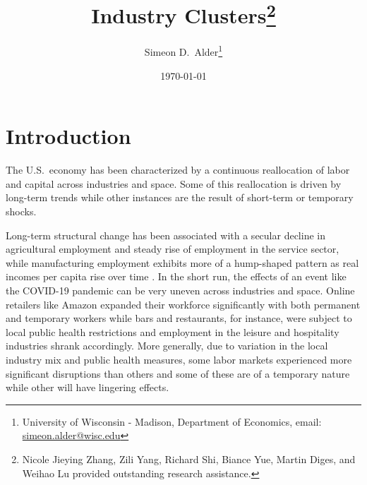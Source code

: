 \documentclass[onehalfspacing,11pt]{article}
\begin{document}
\begin{titlepage}

\title{Industry Clusters\footnote{Nicole Jieying Zhang, Zili Yang, Richard Shi, Biance Yue, Martin Diges, and Weihao Lu provided outstanding research assistance.}}

\author{Simeon D.~Alder\footnote{University of Wisconsin - Madison, Department of Economics, email: \url{simeon.alder@wisc.edu}}}
\date{\today} %

\maketitle
%
%
%
\end{titlepage}


\section{Introduction}
The U.S.~economy has been characterized by a continuous reallocation of labor and capital across industries and space. Some of this reallocation is driven by long-term trends while other instances are the result of short-term or temporary shocks.

Long-term structural change has been associated with a secular decline in agricultural employment and steady rise of employment in the service sector, while manufacturing employment exhibits more of a hump-shaped pattern as real incomes per capita rise over time \citep{Herrendorf:2013b}. In the short run, the effects of an event like the COVID-19 pandemic can be very uneven across industries and space. Online retailers like Amazon expanded their workforce significantly with both permanent and temporary workers while bars and restaurants, for instance, were subject to local public health restrictions and employment in the leisure and hospitality industries shrank accordingly. More generally, due to variation in the local industry mix and public health measures, some labor markets experienced more significant disruptions than others and some of these are of a temporary nature while other will have lingering effects.
\end{document}
